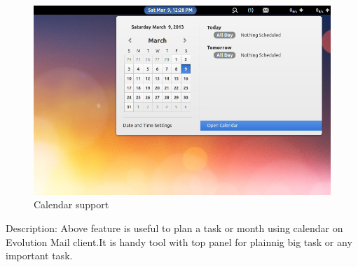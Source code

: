 \newpage
\begin{figure}[h]
\begin{center}
  \includegraphics[scale=0.4] {7.png}
  \caption[Screenshot - Calender applet]{Calendar support}
\end{center}
\end{figure}
Description: Above feature is useful to plan a task or month using calendar on Evolution Mail client.It is handy tool with top panel for plainnig big task or any important task.

\newpage

